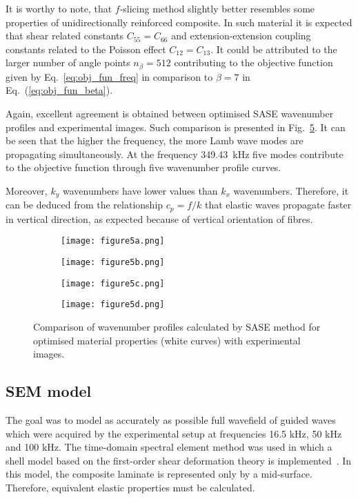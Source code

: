 \documentclass[preprint,12pt]{elsarticle}
\begin{document}
It is worthy to note, that $f$-slicing method slightly better resembles some properties of unidirectionally reinforced composite.
In such material it is expected that shear related constants $C_{55}=C_{66}$ and extension-extension coupling constants related to the Poisson effect $C_{12}=C_{13}$.
It could be attributed to the larger number of angle points $n_{\beta}=512$ contributing to the objective function given by Eq.~{\ref{eq:obj_fun_freq}} in comparison to $\beta=7$ in Eq.~(\ref{eq:obj_fun_beta}).

Again, excellent agreement is obtained between optimised SASE wavenumber profiles and experimental images. 
Such comparison is presented in Fig.~\ref{fig:freq_slice_opt}.
It can be seen that the higher the frequency, the more Lamb wave modes are propagating simultaneously.
At the frequency 349.43~kHz five modes contribute to the objective function through five wavenumber profile curves.

Moreover, $k_y$ wavenumbers have lower values than $k_x$ wavenumbers.
Therefore, it can be deduced from the relationship $c_p= f / k$ that elastic waves propagate faster in vertical direction, as expected because of vertical orientation of fibres.

\begin{figure} [h!]
	\centering
	\begin{subfigure}[b]{0.47\textwidth}
		\centering
		\texttt{[image: figure5a.png]}
		\label{fig:freq3_slice_opt}
	\end{subfigure}
	\hfill
	\begin{subfigure}[b]{0.47\textwidth}
		\centering
		\texttt{[image: figure5b.png]}
		\label{fig:freq4_slice_opt}
	\end{subfigure}
	\hfill
	\begin{subfigure}[b]{0.47\textwidth}
		\centering
		\texttt{[image: figure5c.png]}
		\label{fig:freq5_slice_opt}
	\end{subfigure}
	\hfill
	\begin{subfigure}[b]{0.47\textwidth}
		\centering
		\texttt{[image: figure5d.png]}
		\label{fig:freq7_slice_opt}
	\end{subfigure}
	\caption{Comparison of wavenumber profiles calculated by SASE method for optimised material properties (white curves) with experimental images.}
	\label{fig:freq_slice_opt}
\end{figure}
\subsection{SEM model}
The goal was to model as accurately as possible full wavefield of guided waves which were acquired by the experimental setup at frequencies 16.5 kHz, 50 kHz and 100 kHz. 
The time-domain spectral element method was used in which a shell model based on the first-order shear deformation theory is implemented~\cite{Kudela2020a}. 
In this model, the composite laminate is represented only by a mid-surface. Therefore, equivalent elastic properties must be calculated. 
\end{document}
